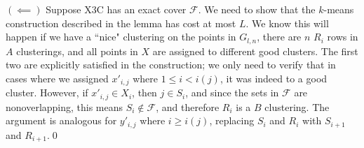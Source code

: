 $(\impliedby)$ Suppose X3C has an exact cover $\mathcal{F}$. We need to show that the $k$-means construction described in the lemma has cost at most $L$. We know this will happen if we have a ``nice" clustering on the points in $G_{l,n}$, there are $n$ $R_i$ rows in $A$ clusterings, and all points in $X$ are assigned to different good clusters. The first two are explicitly satisfied in the construction; we only need to verify that in cases where we assigned $x'_{i,j}$ where $1\le i < i(j)$, it was indeed to a good cluster. However, if $x'_{i,j}\in X_i$, then $j\in S_i$, and since the sets in $\mathcal{F}$ are nonoverlapping, this means $S_i\not\in\mathcal{F}$, and therefore $R_i$ is a $B$ clustering. The argument is analogous for $y'_{i,j}$ where $i \ge i(j)$, replacing $S_i$ and $R_i$ with $S_{i+1}$ and $R_{i+1}$.\qed

